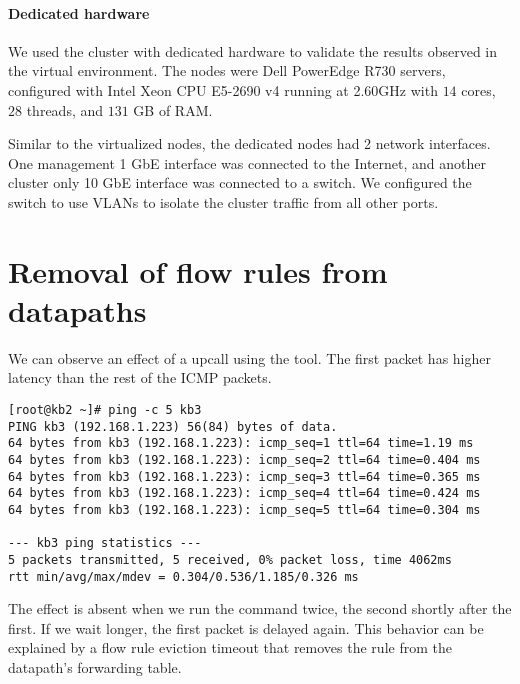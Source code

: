 \paragraph{Dedicated hardware}

We used the cluster with dedicated hardware to validate the results observed in the virtual environment. The nodes were Dell PowerEdge R730 servers, configured with Intel\textsuperscript{\textregistered} Xeon\textsuperscript{\textregistered} CPU E5-2690 v4 running at 2.60GHz with $14$ cores, $28$ threads, and $131$ GB of RAM.

Similar to the virtualized nodes, the dedicated nodes had 2 network interfaces. One management 1 GbE interface was connected to the Internet, and another cluster only 10 GbE interface was connected to a switch. We configured the switch to use VLANs to isolate the cluster traffic from all other ports.


\section{Removal of flow rules from datapaths}
\label{design:flow-eviction}

We can observe an effect of a upcall using the  tool. The first packet has higher latency than the rest of the ICMP packets.

\vspace{0.5cm}

\begin{lstlisting}[caption=Output of the \ident{ping} command in the virtualized environment, captionpos=b, basicstyle=\ttfamily\scriptsize]
[root@kb2 ~]# ping -c 5 kb3
PING kb3 (192.168.1.223) 56(84) bytes of data.
64 bytes from kb3 (192.168.1.223): icmp_seq=1 ttl=64 time=1.19 ms
64 bytes from kb3 (192.168.1.223): icmp_seq=2 ttl=64 time=0.404 ms
64 bytes from kb3 (192.168.1.223): icmp_seq=3 ttl=64 time=0.365 ms
64 bytes from kb3 (192.168.1.223): icmp_seq=4 ttl=64 time=0.424 ms
64 bytes from kb3 (192.168.1.223): icmp_seq=5 ttl=64 time=0.304 ms

--- kb3 ping statistics ---
5 packets transmitted, 5 received, 0% packet loss, time 4062ms
rtt min/avg/max/mdev = 0.304/0.536/1.185/0.326 ms
\end{lstlisting}

The effect is absent when we run the  command twice, the second shortly after the first. If we wait longer, the first packet is delayed again. This behavior can be explained by a flow rule eviction timeout that removes the rule from the datapath's forwarding table.

